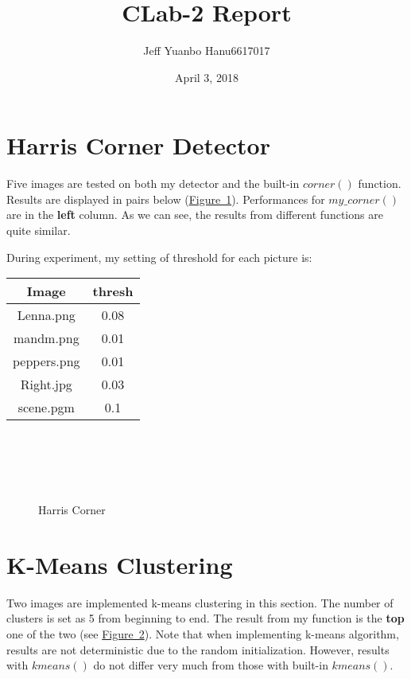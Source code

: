\documentclass{article}
\title{CLab-2 Report}
\author{Jeff Yuanbo Han\quad u6617017}
\date{April 3, 2018}
\begin{document}
\maketitle
\tableofcontents

\section{Harris Corner Detector}
Five images are tested on both my detector and the built-in $corner()$ function. Results are displayed in pairs below (\hyperref[fig-1]{Figure~1}). Performances for \hyperref[code-1]{$my\_corner()$} are in the \textbf{left} column. As we can see, the results from different functions are quite similar.

During experiment, my setting of threshold for each picture is:

\begin{tabular}{cc}
	\toprule
	Image & thresh \\
	\midrule
	Lenna.png & 0.08 \\
	mandm.png & 0.01
\\
	peppers.png & 0.01
\\
	Right.jpg & 0.03
\\
	scene.pgm & 0.1 \\
	\bottomrule
\end{tabular}

\begin{figure}
	\centering
	 \\
	 \\
\end{figure}
\begin{figure}
	\centering
	 \\
	\caption{Harris Corner}
	\label{fig-1}
\end{figure}

\section{K-Means Clustering}
Two images are implemented k-means clustering in this section. The number of clusters is set as 5 from beginning to end. The result from my function is the \textbf{top} one of the two (see \hyperref[fig-2]{Figure~2}). Note that when implementing k-means algorithm, results are not deterministic due to the random initialization. However, results with \hyperref[code-2]{$kmeans()$} do not differ very much from those with built-in \hyperref[code-2]{$kmeans()$}.
\end{document}

